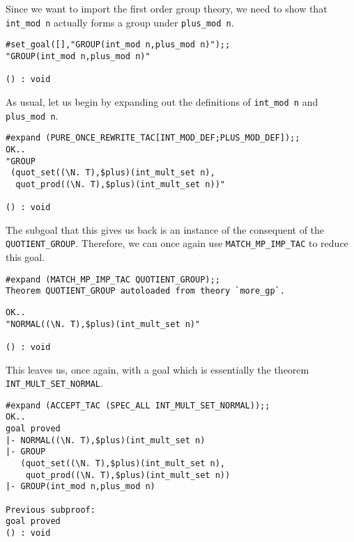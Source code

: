Since we want to import the first order group theory, we need to show
that {\small\verb+int_mod n+} actually forms a group under
{\small\verb+plus_mod n+}.
\begin{session}
\begin{verbatim}
#set_goal([],"GROUP(int_mod n,plus_mod n)");;
"GROUP(int_mod n,plus_mod n)"

() : void
\end{verbatim}
\end{session}

As usual, let us begin by expanding out the definitions of
{\small\verb+int_mod n+} and {\small\verb+plus_mod n+}.
\begin{session}
\begin{verbatim}
#expand (PURE_ONCE_REWRITE_TAC[INT_MOD_DEF;PLUS_MOD_DEF]);;
OK..
"GROUP
 (quot_set((\N. T),$plus)(int_mult_set n),
  quot_prod((\N. T),$plus)(int_mult_set n))"

() : void
\end{verbatim}
\end{session}

The subgoal that this gives us back is an instance of the consequent
of the {\small\verb+QUOTIENT_GROUP+}.  Therefore, we can once again use
{\small\verb+MATCH_MP_IMP_TAC+} to reduce this goal.
\begin{session}
\begin{verbatim}
#expand (MATCH_MP_IMP_TAC QUOTIENT_GROUP);;
Theorem QUOTIENT_GROUP autoloaded from theory `more_gp`.
\end{verbatim}
\mvdots
\begin{verbatim}
OK..
"NORMAL((\N. T),$plus)(int_mult_set n)"

() : void
\end{verbatim}
\end{session}

This leaves us, once again, with a goal which is essentially the
theorem {\small\verb+INT_MULT_SET_NORMAL+}.
\begin{session}
\begin{verbatim}
#expand (ACCEPT_TAC (SPEC_ALL INT_MULT_SET_NORMAL));;
OK..
goal proved
|- NORMAL((\N. T),$plus)(int_mult_set n)
|- GROUP
   (quot_set((\N. T),$plus)(int_mult_set n),
    quot_prod((\N. T),$plus)(int_mult_set n))
|- GROUP(int_mod n,plus_mod n)

Previous subproof:
goal proved
() : void
\end{verbatim}
\end{session}


